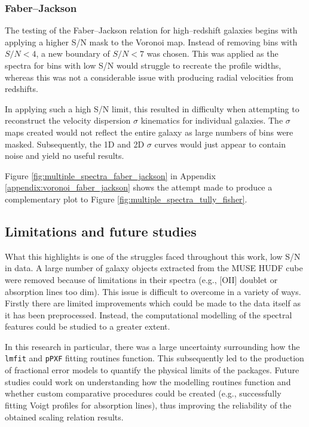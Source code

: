 \documentclass[12pt, twocolumn, nofootinbib]{revtex4-1}    %
\begin{document}
\subsubsection{Faber--Jackson} \label{sec:voronoi_faber_jackson}
\noindent
The testing of the Faber--Jackson relation for high--redshift galaxies begins with applying a higher S/N mask to the Voronoi map. Instead of removing bins with $S/N<4$, a new boundary of $S/N<7$ was chosen. This was applied as the spectra for bins with low S/N would struggle to recreate the profile widths, whereas this was not a considerable issue with producing radial velocities from redshifts. 

In applying such a high S/N limit, this resulted in difficulty when attempting to reconstruct the velocity dispersion $\sigma$ kinematics for individual galaxies. The $\sigma$ maps created would not reflect the entire galaxy as large numbers of bins were masked. Subsequently, the 1D and 2D $\sigma$ curves would just appear to contain noise and yield no useful results.

Figure \ref{fig:multiple_spectra_faber_jackson} in Appendix \ref{appendix:voronoi_faber_jackson} shows the attempt made to produce a complementary plot to Figure \ref{fig:multiple_spectra_tully_fisher}. 

\vspace{2ex} %
\subsection{Limitations and future studies}
\noindent
What this highlights is one of the struggles faced throughout this work, low S/N in data. A large number of galaxy objects extracted from the MUSE HUDF cube were removed because of limitations in their spectra (e.g., [OII] doublet or absorption lines too dim). This issue is difficult to overcome in a variety of ways. Firstly there are limited improvements which could be made to the data itself as it has been preprocessed. Instead, the computational modelling of the spectral features could be studied to a greater extent. 

In this research in particular, there was a large uncertainty surrounding how the \texttt{lmfit} and \texttt{pPXF} fitting routines function. This subsequently led to the production of fractional error models to quantify the physical limits of the packages. Future studies could work on understanding how the modelling routines function and whether custom comparative procedures could be created (e.g., successfully fitting Voigt profiles for absorption lines), thus improving the reliability of the obtained scaling relation results.
\end{document}
